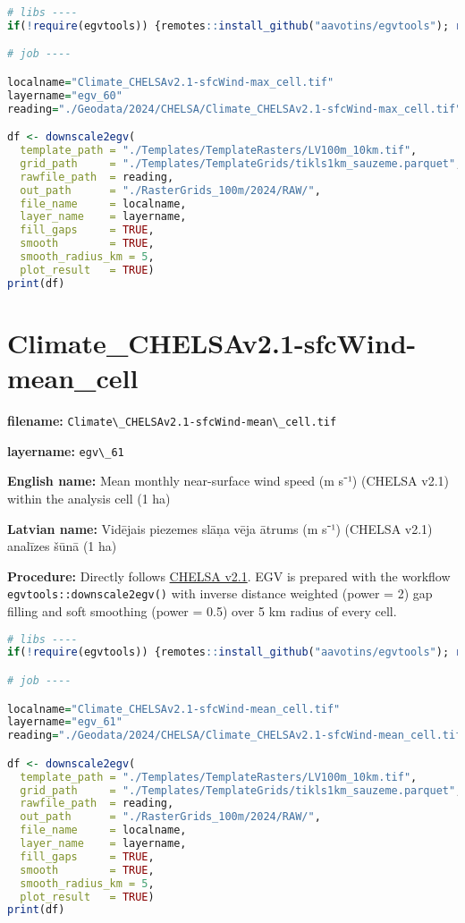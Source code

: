 \documentclass[
]{book}
\newcommand{\passthrough}[1]{#1}
\begin{document}
\begin{lstlisting}[language=R]
# libs ----
if(!require(egvtools)) {remotes::install_github("aavotins/egvtools"); require(egvtools)}

# job ----

localname="Climate_CHELSAv2.1-sfcWind-max_cell.tif"
layername="egv_60"
reading="./Geodata/2024/CHELSA/Climate_CHELSAv2.1-sfcWind-max_cell.tif"

df <- downscale2egv(
  template_path = "./Templates/TemplateRasters/LV100m_10km.tif",
  grid_path     = "./Templates/TemplateGrids/tikls1km_sauzeme.parquet",
  rawfile_path  = reading,
  out_path      = "./RasterGrids_100m/2024/RAW/",
  file_name     = localname,
  layer_name    = layername,
  fill_gaps     = TRUE,
  smooth        = TRUE,
  smooth_radius_km = 5,
  plot_result   = TRUE)
print(df)
\end{lstlisting}

\section{Climate\_CHELSAv2.1-sfcWind-mean\_cell}\label{ch06.061}

\textbf{filename:} \passthrough{\lstinline!Climate\_CHELSAv2.1-sfcWind-mean\_cell.tif!}

\textbf{layername:} \passthrough{\lstinline!egv\_61!}

\textbf{English name:} Mean monthly near-surface wind speed (m s⁻¹) (CHELSA v2.1) within the analysis cell (1 ha)

\textbf{Latvian name:} Vidējais piezemes slāņa vēja ātrums (m s⁻¹) (CHELSA v2.1) analīzes šūnā (1 ha)

\textbf{Procedure:} Directly follows \hyperref[Ch04.11]{CHELSA v2.1}. EGV is prepared with the
workflow \passthrough{\lstinline!egvtools::downscale2egv()!} with inverse distance weighted (power = 2)
gap filling and soft smoothing (power = 0.5) over 5 km radius of every cell.

\begin{lstlisting}[language=R]
# libs ----
if(!require(egvtools)) {remotes::install_github("aavotins/egvtools"); require(egvtools)}

# job ----

localname="Climate_CHELSAv2.1-sfcWind-mean_cell.tif"
layername="egv_61"
reading="./Geodata/2024/CHELSA/Climate_CHELSAv2.1-sfcWind-mean_cell.tif"

df <- downscale2egv(
  template_path = "./Templates/TemplateRasters/LV100m_10km.tif",
  grid_path     = "./Templates/TemplateGrids/tikls1km_sauzeme.parquet",
  rawfile_path  = reading,
  out_path      = "./RasterGrids_100m/2024/RAW/",
  file_name     = localname,
  layer_name    = layername,
  fill_gaps     = TRUE,
  smooth        = TRUE,
  smooth_radius_km = 5,
  plot_result   = TRUE)
print(df)
\end{lstlisting}
\end{document}
